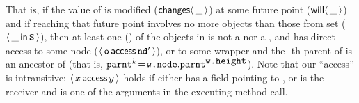 \noindent
That is, if  the value of  is modified (${\mathsf{changes}}\langle\,\_\,\rangle$) at some future point (${\mathsf{will}}\langle \,\_\,\rangle$) 
and if reaching that future point involves no more objects than those from
set  (\ie ${\langle\, \_\, \mathsf{in}\, {\mbox{\tt{S}}}\, \rangle}$), then at least one () of the objects in  is not a  nor a , and  has direct access to some  node ($\langle\, {\mbox{\tt{o}}}\, \mathsf{access}\, {\mbox{\tt{nd}}}'\, \rangle$), or  to some wrapper  and the -th parent of  is an ancestor of  (that is, ${\mbox{\tt{parnt}}}^k\!=\!{\mbox{\tt{w.node}}}.{\mbox{\tt{parnt}}}^{{\mbox{\tt{w.height}}}}$).
 Note that our ``access'' is intransitive: $\langle\, x\, \mathsf{access}\, y\, \rangle$ holds if  either  has a field  pointing to , or    is the receiver and  is one of the arguments  in the executing method call.

 
 
